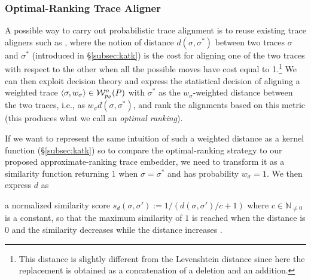 \subsubsection{Optimal-Ranking Trace Aligner}\label{subsec:eta}
{A possible way to carry out probabilistic trace alignment is to reuse existing trace aligners such as \cite{LeoniM17}, where the notion of distance $d(\sigma,\sigma^*)$ between two traces $\sigma$ and $\sigma^*$ (introduced in \S\ref{subsec:katk}) is the  cost for aligning one of the two traces with respect to the other when all the possible moves have cost equal to 1.\footnote{This distance is slightly different from the Levenshtein distance since here the replacement is obtained as a concatenation of a deletion and an addition.} We can then exploit decision theory \cite{dectheor} and express the statistical decision of aligning a weighted trace $\braket{\sigma,w_\sigma}\in\mathcal{W}_{p_\theta}^n(P)$ with $\sigma^*$ as the $w_\sigma$-weighted distance between the two traces, i.e., as $w_\sigma d(\sigma,\sigma^*)$, and rank the alignments based on this metric (this produces what we call an \emph{optimal ranking}).

If we want to represent the same intuition of such a weighted distance as a kernel function (\S\ref{subsec:katk}) so to compare the optimal-ranking strategy to our proposed approximate-ranking trace embedder, we need to transform it as a similarity function returning $1$ when $\sigma=\sigma^*$ and has probability $w_\sigma=1$. We then express $d$ as}
a normalized similarity score $s_d(\sigma,\sigma'):=1/(d(\sigma,\sigma')/c+1)$ where $c\in\mathbb{N}_{\neq 0}$ is a constant, so that the maximum similarity of $1$ is reached when the distance is $0$ and the similarity decreases while the distance increases \cite{BergamiBM20}. %
